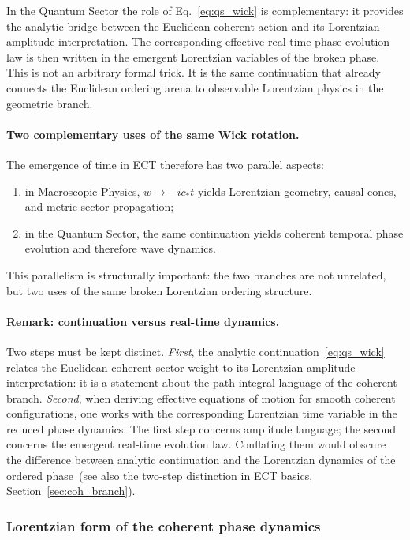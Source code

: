 \documentclass[11pt,a4paper]{article}
\numberwithin{equation}{section}
\begin{document}
In the Quantum Sector the role of Eq.~\eqref{eq:qs_wick} is
complementary: it provides the analytic bridge between the Euclidean
coherent action and its Lorentzian amplitude interpretation.
The corresponding effective real-time phase evolution law is then
written in the emergent Lorentzian variables of the broken phase.
This is not an arbitrary formal trick.
It is the same continuation that already connects the Euclidean
ordering arena to observable Lorentzian physics in the geometric branch.

\paragraph{Two complementary uses of the same Wick rotation.}
The emergence of time in ECT therefore has two parallel aspects:
\begin{enumerate}[label=(\roman*)]
  \item in Macroscopic Physics, $w\to -ic_*t$ yields Lorentzian
    geometry, causal cones, and metric-sector propagation;
  \item in the Quantum Sector, the same continuation yields coherent
    temporal phase evolution and therefore wave dynamics.
\end{enumerate}
This parallelism is structurally important: the two branches are not
unrelated, but two uses of the same broken Lorentzian ordering
structure.


\paragraph{Remark: continuation versus real-time dynamics.}
Two steps must be kept distinct.
\textit{First}, the analytic continuation~\eqref{eq:qs_wick}
relates the Euclidean coherent-sector weight to its Lorentzian
amplitude interpretation: it is a statement about the
path-integral language of the coherent branch.
\textit{Second}, when deriving effective equations of motion for
smooth coherent configurations, one works with the corresponding
Lorentzian time variable in the reduced phase dynamics.
The first step concerns amplitude language;
the second concerns the emergent real-time evolution law.
Conflating them would obscure the difference between analytic
continuation and the Lorentzian dynamics of the ordered phase~(see
also the two-step distinction in ECT basics,
Section~\ref{sec:coh_branch}).

\subsubsection*{Lorentzian form of the coherent phase dynamics}
\end{document}
